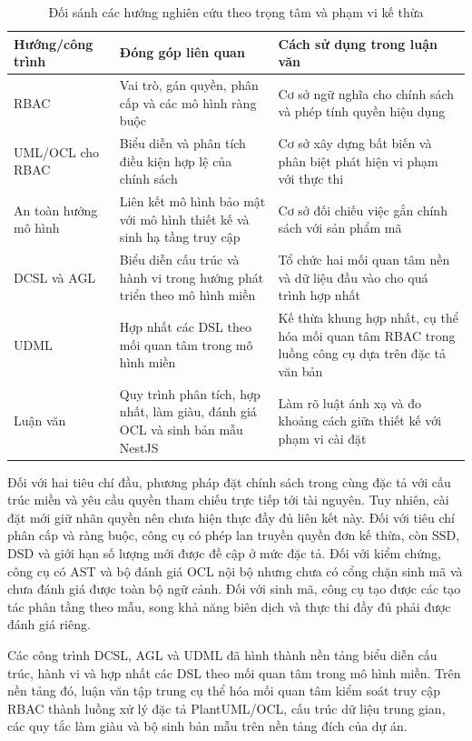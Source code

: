 \begin{table}[htbp]
\centering
\caption{Đối sánh các hướng nghiên cứu theo trọng tâm và phạm vi kế thừa}
\label{tab:khoang-trong}
\small
\begin{tabularx}{\textwidth}{@{}p{2.7cm}XX@{}}
\toprule
\textbf{Hướng/công trình} & \textbf{Đóng góp liên quan} & \textbf{Cách sử dụng trong luận văn} \\
\midrule
RBAC \citep{sandhu1996} & Vai trò, gán quyền, phân cấp và các mô hình ràng buộc & Cơ sở ngữ nghĩa cho chính sách và phép tính quyền hiệu dụng \\
UML/OCL cho RBAC \citep{ray2004,sohr2008} & Biểu diễn và phân tích điều kiện hợp lệ của chính sách & Cơ sở xây dựng bất biến và phân biệt phát hiện vi phạm với thực thi \\
An toàn hướng mô hình \citep{lodderstedt2002,basin2006} & Liên kết mô hình bảo mật với mô hình thiết kế và sinh hạ tầng truy cập & Cơ sở đối chiếu việc gắn chính sách với sản phẩm mã \\
DCSL và AGL \citep{le2018dcsl,dang2023agl} & Biểu diễn cấu trúc và hành vi trong hướng phát triển theo mô hình miền & Tổ chức hai mối quan tâm nền và dữ liệu đầu vào cho quá trình hợp nhất \\
UDML \citep{le2025udml} & Hợp nhất các DSL theo mối quan tâm trong mô hình miền & Kế thừa khung hợp nhất, cụ thể hóa mối quan tâm RBAC trong luồng công cụ dựa trên đặc tả văn bản \\
Luận văn & Quy trình phân tích, hợp nhất, làm giàu, đánh giá OCL và sinh bản mẫu NestJS & Làm rõ luật ánh xạ và đo khoảng cách giữa thiết kế với phạm vi cài đặt \\
\bottomrule
\end{tabularx}
\end{table}

Đối với hai tiêu chí đầu, phương pháp đặt chính sách trong cùng đặc tả với cấu trúc miền và yêu cầu quyền tham chiếu trực tiếp tới tài nguyên. Tuy nhiên, cài đặt mới giữ nhãn quyền nên chưa hiện thực đầy đủ liên kết này. Đối với tiêu chí phân cấp và ràng buộc, công cụ có phép lan truyền quyền đơn kế thừa, còn SSD, DSD và giới hạn số lượng mới được đề cập ở mức đặc tả. Đối với kiểm chứng, công cụ có AST và bộ đánh giá OCL nội bộ nhưng chưa có cổng chặn sinh mã và chưa đánh giá được toàn bộ ngữ cảnh. Đối với sinh mã, công cụ tạo được các tạo tác phân tầng theo mẫu, song khả năng biên dịch và thực thi đầy đủ phải được đánh giá riêng.

Các công trình DCSL, AGL và UDML \citep{le2018dcsl,dang2023agl,le2025udml} đã hình thành nền tảng biểu diễn cấu trúc, hành vi và hợp nhất các DSL theo mối quan tâm trong mô hình miền. Trên nền tảng đó, luận văn tập trung cụ thể hóa mối quan tâm kiểm soát truy cập RBAC thành luồng xử lý đặc tả PlantUML/OCL, cấu trúc dữ liệu trung gian, các quy tắc làm giàu và bộ sinh bản mẫu trên nền tảng đích của dự án.

